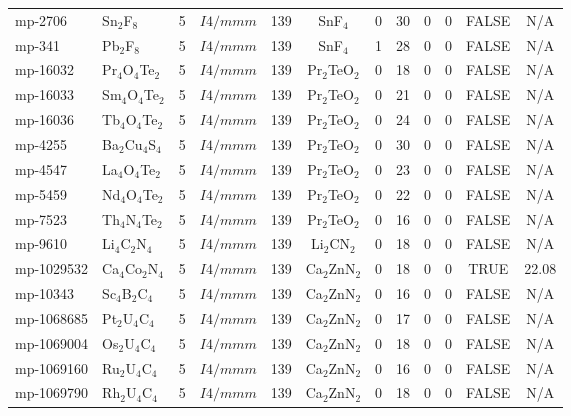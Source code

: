 {\begin{longtable}{llcccccccccc}
    mp-2706 & Sn$_{2}$F$_{8}$ & 5     & $I4/mmm$ & 139   & SnF$_{4}$ & 0     & 30    & 0     & 0     & FALSE & N/A \\
    mp-341 & Pb$_{2}$F$_{8}$ & 5     & $I4/mmm$ & 139   & SnF$_{4}$ & 1     & 28    & 0     & 0     & FALSE & N/A \\
    mp-16032 & Pr$_{4}$O$_{4}$Te$_{2}$ & 5     & $I4/mmm$ & 139   & Pr$_{2}$TeO$_{2}$ & 0     & 18    & 0     & 0     & FALSE & N/A \\
    mp-16033 & Sm$_{4}$O$_{4}$Te$_{2}$ & 5     & $I4/mmm$ & 139   & Pr$_{2}$TeO$_{2}$ & 0     & 21    & 0     & 0     & FALSE & N/A \\
    mp-16036 & Tb$_{4}$O$_{4}$Te$_{2}$ & 5     & $I4/mmm$ & 139   & Pr$_{2}$TeO$_{2}$ & 0     & 24    & 0     & 0     & FALSE & N/A \\
    mp-4255 & Ba$_{2}$Cu$_{4}$S$_{4}$ & 5     & $I4/mmm$ & 139   & Pr$_{2}$TeO$_{2}$ & 0     & 30    & 0     & 0     & FALSE & N/A \\
    mp-4547 & La$_{4}$O$_{4}$Te$_{2}$ & 5     & $I4/mmm$ & 139   & Pr$_{2}$TeO$_{2}$ & 0     & 23    & 0     & 0     & FALSE & N/A \\
    mp-5459 & Nd$_{4}$O$_{4}$Te$_{2}$ & 5     & $I4/mmm$ & 139   & Pr$_{2}$TeO$_{2}$ & 0     & 22    & 0     & 0     & FALSE & N/A \\
    mp-7523 & Th$_{4}$N$_{4}$Te$_{2}$ & 5     & $I4/mmm$ & 139   & Pr$_{2}$TeO$_{2}$ & 0     & 16    & 0     & 0     & FALSE & N/A \\
    mp-9610 & Li$_{4}$C$_{2}$N$_{4}$ & 5     & $I4/mmm$ & 139   & Li$_{2}$CN$_{2}$ & 0     & 18    & 0     & 0     & FALSE & N/A \\
    mp-1029532 & Ca$_{4}$Co$_{2}$N$_{4}$ & 5     & $I4/mmm$ & 139   & Ca$_{2}$ZnN$_{2}$ & 0     & 18    & 0     & 0     & TRUE  & 22.08  \\
    mp-10343 & Sc$_{4}$B$_{2}$C$_{4}$ & 5     & $I4/mmm$ & 139   & Ca$_{2}$ZnN$_{2}$ & 0     & 16    & 0     & 0     & FALSE & N/A \\
    mp-1068685 & Pt$_{2}$U$_{4}$C$_{4}$ & 5     & $I4/mmm$ & 139   & Ca$_{2}$ZnN$_{2}$ & 0     & 17    & 0     & 0     & FALSE & N/A \\
    mp-1069004 & Os$_{2}$U$_{4}$C$_{4}$ & 5     & $I4/mmm$ & 139   & Ca$_{2}$ZnN$_{2}$ & 0     & 18    & 0     & 0     & FALSE & N/A \\
    mp-1069160 & Ru$_{2}$U$_{4}$C$_{4}$ & 5     & $I4/mmm$ & 139   & Ca$_{2}$ZnN$_{2}$ & 0     & 16    & 0     & 0     & FALSE & N/A \\
    mp-1069790 & Rh$_{2}$U$_{4}$C$_{4}$ & 5     & $I4/mmm$ & 139   & Ca$_{2}$ZnN$_{2}$ & 0     & 18    & 0     & 0     & FALSE & N/A \\

\end{longtable}}
